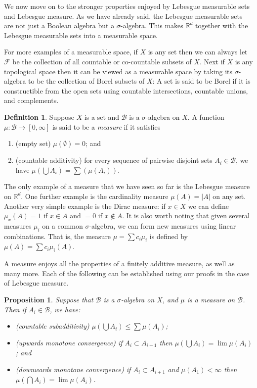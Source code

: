 \documentclass[11pt,oneside]{amsbook}
\newcommand{\RR}{{\mathbb R}}
\theoremstyle{definition}
\theoremstyle{plain}
\newtheorem{prop}[thm]{Proposition}
\theoremstyle{definition}
\newtheorem{defn}[thm]{Definition}
\theoremstyle{remark}
\numberwithin{equation}{section}
\numberwithin{figure}{section}
\begin{document}
We now move on to the stronger properties enjoyed by Lebesgue measurable sets and Lebesgue measure. As we have already said, the Lebesgue measurable sets are not just a Boolean algebra but a $\sigma$-algebra. This makes $\RR^d$ together with the Lebesgue measurable sets into a measurable space. 

For more examples of a measurable space, if $X$ is any set then we can always let $\mathcal F$ be the collection of all countable or co-countable subsets of $X$. Next if $X$ is any topological space then it can be viewed as a measurable space by taking its $\sigma$-algebra to be the collection of Borel subsets of $X$: A set is said to be Borel if it is constructible from the open sets using countable intersections, countable unions, and complements.

\begin{defn}
  Suppose $X$ is a set and $\mathcal B$ is a $\sigma$-algebra on $X$. A function $\mu\colon\mathcal B\to[0,\infty]$ is said to be a \emph{measure} if it satisfies
  \begin{enumerate}
  \item (empty set) $\mu(\emptyset)=0$; and
  \item (countable additivity) for every sequence of pairwise disjoint sets $A_i\in\mathcal B$, we have $\mu(\bigcup A_i)=\sum(\mu(A_i))$.
  \end{enumerate}
\end{defn}

The only example of a measure that we have seen so far is the Lebesgue measure on $\RR^d$. One further example is the cardinality measure $\mu(A)=|A|$ on any set. Another very simple example is the Dirac measure: if $x\in X$ we can define $\mu_x(A)=1$ if $x\in A$ and $=0$ if $x\notin A$. It is also worth noting that given several measures $\mu_i$ on a common $\sigma$-algebra, we can form new measures using linear combinations. That is, the measure $\mu=\sum c_i\mu_i$ is defined by $\mu(A)=\sum c_i\mu_i(A)$.

A measure enjoys all the properties of a finitely additive measure, as well as many more. Each of the following can be established using our proofs in the case of Lebesgue measure.

\begin{prop}
  Suppose that $\mathcal B$ is a $\sigma$-algebra on $X$, and $\mu$ is a measure on $\mathcal B$. Then if $A_i\in\mathcal B$, we have:
  \begin{itemize}
  \item (countable subadditivity) $\mu(\bigcup A_i)\leq\sum\mu(A_i)$;
  \item (upwards monotone convergence) if $A_i\subset A_{i+1}$ then $\mu(\bigcup A_i)=\lim\mu(A_i)$; and
  \item (downwards monotone convergence) if $A_i\subset A_{i+1}$ and $\mu(A_1)<\infty$ then $\mu(\bigcap A_i)=\lim\mu(A_i)$.
  \end{itemize}
\end{prop}
\end{document}
